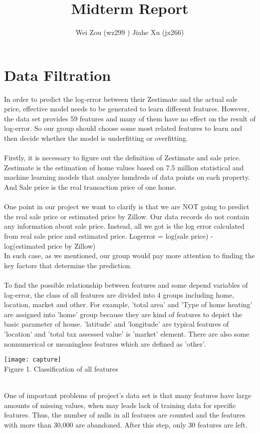 \documentclass[12pt]{article}
\begin{document}
\title{Midterm Report}
\author{Wei Zou (wz299 )  Jiahe Xu (jx266)}
\maketitle

\section{Data Filtration}
In order to predict the log-error between their Zestimate and the actual sale price, effective model needs to be generated to learn different features. However, the data set provides 59 features and many of them have no effect on the result of log-error. So our group should choose some most related features to learn and then decide whether the model is underfitting or overfitting.\\
\\
Firstly, it is necessary to figure out the definition of Zestimate and sale price. Zestimate is the estimation of home values based on 7.5 million statistical and machine learning models that analyze hundreds of data points on each property. And Sale price is the real transaction price of one home. \\
\\One point in our project we want to clarify is that we are NOT going to predict the real sale price or estimated price by Zillow. Our data records do not contain any information about sale price. Instead, all we got is the log error calculated from real sale price and estimated price. 
Logerror = log(sale price) - log(estimated price by Zillow)\\
In such case, as we mentioned, our group would pay more attention to finding the key factors that determine the prediction. \\
\\To find the possible relationship between features and some depend variables of log-error, the class of all features are divided into 4 groups including home, location, market and other. For example, 'total area' and 'Type of home heating' are assigned into 'home' group because they are kind of features to depict the basic parameter of house. 'latitude' and 'longitude' are typical features of 'location' and 'total tax assessed value' is 'market' element. There are also some nonnumerical or meaningless features which are defined as 'other'. \\

\begin{center}
\texttt{[image: capture]}\\
Figure 1. Classification of all features
\end{center}\\One of important problems of project's data set is that many features have large amounts of missing values, when may leads lack of training data for specific features. Thus, the number of nulls in all features are counted and the features with more than 30,000 are abandoned. After this step, only 30 features are left.
\end{document}
